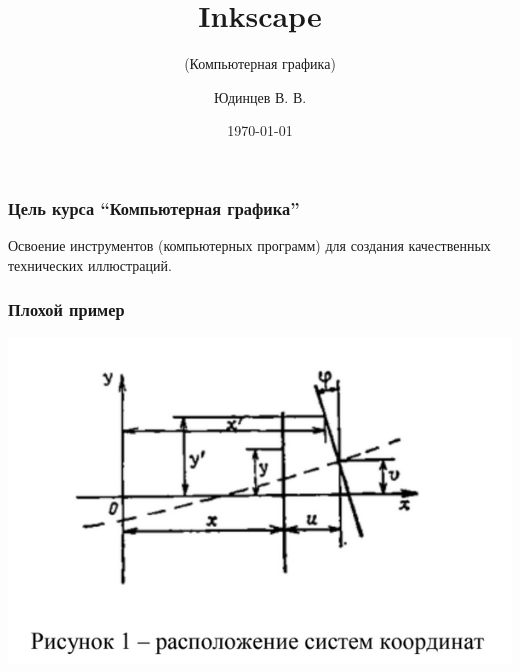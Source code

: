 \documentclass[12pt, compress]{beamer}
\title[Inkscape]{Inkscape}
\subtitle{(Компьютерная графика)}
\author[Самарский университет]{Юдинцев В. В.}
\institute{Кафедра теоретической механики\\Самарский университет}
\date{\today}
\renewcommand{\emph}[1]{\textcolor{dark-blue}{#1}}
\begin{document}
{
\begin{frame}[plain]
\maketitle
\end{frame}
}

%
%

\begin{frame}[c]
\frametitle{Цель курса ``Компьютерная графика''}
Освоение инструментов (компьютерных программ) для создания качественных \emph{технических иллюстраций}.
\end{frame}

\begin{frame}
\frametitle{Плохой пример}
\includegraphics[width=1\textwidth]{плагиат.png}
\end{frame}
\end{document}

